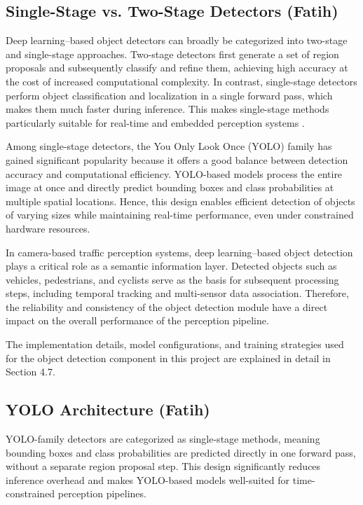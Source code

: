 \documentclass[12pt,a4paper]{report}
\begin{document}
\subsection{Single-Stage vs. Two-Stage Detectors (Fatih)}

Deep learning–based object detectors can broadly be categorized into two-stage and single-stage approaches. Two-stage detectors first generate a set of region proposals and subsequently classify and refine them, achieving high accuracy at the cost of increased computational complexity. In contrast, single-stage detectors perform object classification and localization in a single forward pass, which makes them much faster during inference. This makes single-stage methods particularly suitable for real-time and embedded perception systems \cite{redmon2016yolo}.


Among single-stage detectors, the You Only Look Once (YOLO) family has gained significant popularity because it offers a good balance between detection accuracy and computational efficiency. YOLO-based models process the entire image at once and directly predict bounding boxes and class probabilities at multiple spatial locations. Hence, this design enables efficient detection of objects of varying sizes while maintaining real-time performance, even under constrained hardware resources. 

In camera-based traffic perception systems, deep learning–based object detection plays a critical role as a semantic information layer. Detected objects such as vehicles, pedestrians, and cyclists serve as the basis for subsequent processing steps, including temporal tracking and multi-sensor data association. Therefore, the reliability and consistency of the object detection module have a direct impact on the overall performance of the perception pipeline. 

The implementation details, model configurations, and training strategies used for the object detection component in this project are explained in detail in Section 4.7. 

\subsection{YOLO Architecture (Fatih)} 

YOLO-family detectors are categorized as single-stage methods, meaning bounding boxes and class probabilities are predicted directly in one forward pass, without a separate region proposal step. This design significantly reduces inference overhead and makes YOLO-based models well-suited for time-constrained perception pipelines.
\end{document}
